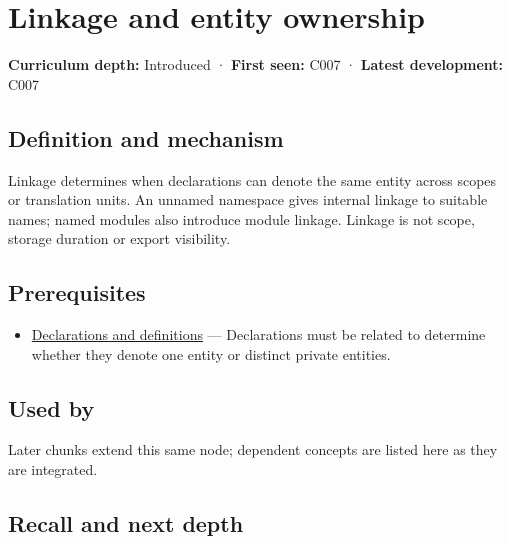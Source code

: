 \hypertarget{appendix-74a0ec818c18}{}\label{referencestart:appendix-74a0ec818c18}
\section{Linkage and entity ownership}\label{appendix-74a0ec818c18-linkage-and-entity-ownership}

\textbf{Curriculum depth:} Introduced · \textbf{First seen:} C007 · \textbf{Latest development:} C007

\begin{allmightroledefinition}

\subsection{Definition and mechanism}\label{appendix-74a0ec818c18-definition-and-mechanism}

Linkage determines when declarations can denote the same entity across scopes or translation units. An unnamed namespace gives internal linkage to suitable names; named modules also introduce module linkage. Linkage is not scope, storage duration or export visibility.

\end{allmightroledefinition}

\subsection{Prerequisites}\label{appendix-74a0ec818c18-prerequisites}

\begin{itemize}
\tightlist
\item
  \hyperref[appendix-2e4d494c2d94]{Declarations and definitions} --- Declarations must be related to determine whether they denote one entity or distinct private entities.
\end{itemize}

\subsection{Used by}\label{appendix-74a0ec818c18-used-by}

Later chunks extend this same node; dependent concepts are listed here as they are integrated.

\subsection{Recall and next depth}\label{appendix-74a0ec818c18-recall-and-next-depth}

